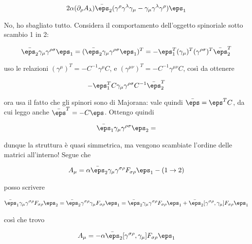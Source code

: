 \documentclass{report}
\begin{document}
\begin{align}
    2\alpha (\partial_\rho A_\lambda)\bar{\eps}_2(\gamma^\rho \gamma^\lambda \gamma_\mu - \gamma_\mu \gamma^\lambda \gamma^\rho) \eps_1
\end{align}

No, ho sbagliato tutto. Considera il comportamento dell'oggetto spinoriale sotto scambio 1 in 2:  

\begin{align}
    \bar{\eps_2}\gamma_\mu \gamma^{\rho\sigma}\eps_1 = (\bar{\eps_2}\gamma_\mu \gamma^{\rho\sigma}\eps_1)^T = -\eps_1^T (\gamma_\mu)^T (\gamma^{\rho\sigma})^T \bar{\eps}_2^T 
\end{align}

uso le relazioni \((\gamma^\mu)^T = -C^{-1}\gamma^\mu C\), e \((\gamma^{\mu\nu})^T = - C^{-1}\gamma^{\mu\nu}C\), così da ottenere

\begin{align}
    -\eps_1^T C \gamma_\mu \gamma^{\rho\sigma} C^{-1}\bar{\eps}_2^T 
\end{align}

ora usa il fatto che gli spinori sono di Majorana: vale quindi \(\bar{\eps} = \eps^T  C\), da cui leggo anche \(\bar{\eps}^T = -C \eps\). Ottengo quindi 

\begin{align}
    \bar{\eps}_1 \gamma_\mu \gamma^{\rho \sigma}\eps_2 = 
\end{align}

dunque la struttura è quasi simmetrica, ma vengono scambiate l'ordine delle matrici all'interno! Segue che 

\begin{align}
    [\delta_{\eps_1}, \delta_{\eps_2}]A_\mu = \alpha \bar{\eps}_2 \gamma_\mu \gamma^{\sigma \rho}F_{\sigma \rho} \eps_1 - (1 \to 2)
\end{align}

posso scrivere 

\begin{align}
    \bar{\eps}_1 \gamma_\mu \gamma^{\sigma \rho}F_{\sigma \rho} \eps_2 = \bar{\eps}_2 \gamma^{\sigma \rho} \gamma_\mu F_{\sigma \rho} \eps_1 = \bar{\eps}_2  \gamma_\mu \gamma^{\sigma \rho} F_{\sigma \rho} \eps_1 + \bar{\eps}_2  [\gamma^{\sigma \rho}, \gamma_\mu] F_{\sigma \rho} \eps_1 
\end{align}

così che trovo 

\begin{align}
    [\delta_{\eps_1}, \delta_{\eps_2}]A_\mu = -\alpha \bar{\eps}_2 [\gamma^{\sigma\rho}, \gamma_\mu]F_{\sigma \rho}\eps_1
\end{align}
\end{document}
